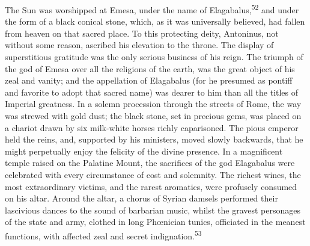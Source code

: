
The Sun was worshipped at Emesa, under the name of Elagabalus,\textsuperscript{52}
and under the form of a black conical stone, which, as it was
universally believed, had fallen from heaven on that sacred
place. To this protecting deity, Antoninus, not without some
reason, ascribed his elevation to the throne. The display of
superstitious gratitude was the only serious business of his
reign. The triumph of the god of Emesa over all the religions of
the earth, was the great object of his zeal and vanity; and the
appellation of Elagabalus (for he presumed as pontiff and
favorite to adopt that sacred name) was dearer to him than all
the titles of Imperial greatness. In a solemn procession through
the streets of Rome, the way was strewed with gold dust; the
black stone, set in precious gems, was placed on a chariot drawn
by six milk-white horses richly caparisoned. The pious emperor
held the reins, and, supported by his ministers, moved slowly
backwards, that he might perpetually enjoy the felicity of the
divine presence. In a magnificent temple raised on the Palatine
Mount, the sacrifices of the god Elagabalus were celebrated with
every circumstance of cost and solemnity. The richest wines, the
most extraordinary victims, and the rarest aromatics, were
profusely consumed on his altar. Around the altar, a chorus of
Syrian damsels performed their lascivious dances to the sound of
barbarian music, whilst the gravest personages of the state and
army, clothed in long Phœnician tunics, officiated in the meanest
functions, with affected zeal and secret indignation.\textsuperscript{53}



